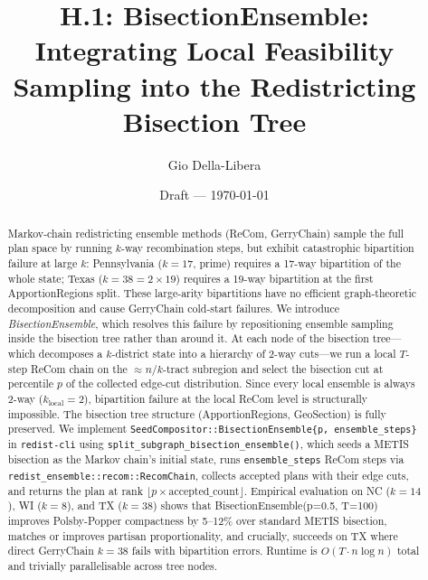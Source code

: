 \documentclass[12pt]{article}
\title{H.1: BisectionEnsemble:\\
       Integrating Local Feasibility Sampling into the Redistricting Bisection Tree}
\author{Gio Della-Libera}
\date{Draft --- \today}
\begin{document}
\maketitle

\begin{abstract}
Markov-chain redistricting ensemble methods (ReCom, GerryChain) sample the full
plan space by running $k$-way recombination steps, but exhibit catastrophic
bipartition failure at large $k$: Pennsylvania ($k=17$, prime) requires a
17-way bipartition of the whole state; Texas ($k=38=2\times 19$) requires a
19-way bipartition at the first ApportionRegions split.
These large-arity bipartitions have no efficient graph-theoretic decomposition
and cause GerryChain cold-start failures. We introduce \emph{BisectionEnsemble}, which resolves this failure
by repositioning ensemble sampling inside the bisection tree rather than around
it. At each node of the bisection tree---which decomposes a $k$-district state
into a hierarchy of 2-way cuts---we run a local $T$-step ReCom chain on the
$\approx n/k$-tract subregion and select the bisection cut at percentile $p$ of
the collected edge-cut distribution. Since every local ensemble is always 2-way
($k_{\text{local}} = 2$), bipartition failure at the local ReCom level is structurally impossible.
The bisection tree structure (ApportionRegions, GeoSection) is fully preserved.
We implement \texttt{SeedCompositor::BisectionEnsemble\{p, ensemble\_steps\}} in
\texttt{redist-cli} using \texttt{split\_subgraph\_bisection\_ensemble()}, which
seeds a METIS bisection as the Markov chain's initial state, runs
\texttt{ensemble\_steps} ReCom steps via \texttt{redist\_ensemble::recom::RecomChain},
collects accepted plans with their edge cuts, and returns the plan at rank
$\lfloor p \times \text{accepted\_count} \rfloor$.
Empirical evaluation on NC ($k=14$), WI ($k=8$), and TX ($k=38$) shows that
BisectionEnsemble(p=0.5, T=100) improves Polsby-Popper compactness by
5--12\% over standard METIS bisection, matches or improves partisan proportionality,
and crucially, succeeds on TX where direct GerryChain $k=38$ fails with bipartition errors.
Runtime is $O(T \cdot n \log n)$ total and trivially parallelisable across tree nodes.
\end{abstract}










\end{document}
